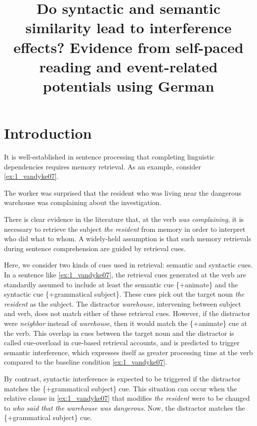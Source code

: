 \documentclass[a4paper, man, floatsintext]{apa7}
\title{\hspace{1cm} Do syntactic and semantic similarity lead to interference effects?
\newline
Evidence from self-paced reading and event-related potentials using German}
\affiliation{
Department of Linguistics, University of Potsdam}
\begin{document}
\maketitle

\section{Introduction}

It is well-established in sentence processing that completing linguistic dependencies requires memory retrieval. As an example, consider 
\ref{ex:1_vandyke07}.

\begin{exe}[ht]
\ex \label{ex:1_vandyke07} 
The worker was surprised that the resident who was living near the dangerous warehouse was complaining about the investigation. \parencite{vandyke07}
\end{exe}

There is clear evidence in the literature  \parencite[e.g.,][]{jaeger_etal_2020, nicenboim, vandyke_mcelree06, vandyke_lewis03} that, at the verb \textit{was complaining}, it is necessary to retrieve the subject \textit{the resident} from memory in order to interpret who did what to whom. A widely-held assumption is that such memory retrievals during sentence comprehension are guided by retrieval cues. 

Here, we consider two kinds of cues used in retrieval: semantic and  syntactic cues.
In a sentence like \ref{ex:1_vandyke07}, the retrieval cues generated at the verb are standardly assumed to include at least  the semantic cue \{+animate\} and the syntactic cue \{+grammatical subject\}. These cues pick out the target noun \textit{the resident} as the subject. The distractor \textit{warehouse}, intervening between subject and verb, does not match either of these retrieval cues. However, if the distractor were \textit{neighbor} instead of \textit{warehouse}, then it would match the \{+animate\} cue at the verb. This overlap in cues between the target noun and the distractor is called cue-overload in cue-based retrieval accounts, and is predicted to trigger semantic interference, which expresses itself as greater processing time at the verb compared to the baseline condition \ref{ex:1_vandyke07}.

By contrast, syntactic interference is expected to be triggered if the distractor matches the \{+grammatical subject\} cue. This situation can occur when the relative clause  in \ref{ex:1_vandyke07} that modifies \textit{the resident} were to be changed to \textit{who said that the warehouse was dangerous}. Now, the distractor matches the \{+grammatical subject\} cue. 
\end{document}
